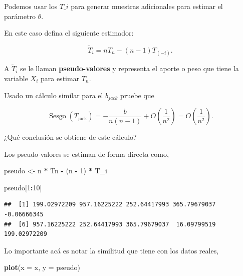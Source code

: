 \documentclass[
  12pt,
]{book}
\newenvironment{Shaded}{\begin{snugshade}}{\end{snugshade}}
\newcommand{\DataTypeTok}[1]{\textcolor[rgb]{0.13,0.29,0.53}{#1}}
\newcommand{\DecValTok}[1]{\textcolor[rgb]{0.00,0.00,0.81}{#1}}
\newcommand{\KeywordTok}[1]{\textcolor[rgb]{0.13,0.29,0.53}{\textbf{#1}}}
\newcommand{\NormalTok}[1]{#1}
\newcommand{\OperatorTok}[1]{\textcolor[rgb]{0.81,0.36,0.00}{\textbf{#1}}}
\newcommand{\StringTok}[1]{\textcolor[rgb]{0.31,0.60,0.02}{#1}}
\theoremstyle{definition}
\theoremstyle{definition}
\theoremstyle{definition}
\theoremstyle{remark}
\let\BeginKnitrBlock\begin \let\EndKnitrBlock\end
\begin{document}
Podemos usar los \(T\_i\) para generar muestras adicionales para
estimar el parámetro \(\theta\).

En este caso defina el siguiente estimador:

\[
\widetilde{T}_{i}=n T_{n}-(n-1) T_{(-i)}.
\]

\BeginKnitrBlock{remark}
{}A \(\widetilde{T}_{i}\) se le llaman \textbf{pseudo-valores} y
representa el aporte o peso que tiene la variable \(X_{i}\) para
estimar \(T_{n}\).
\EndKnitrBlock{remark}

\BeginKnitrBlock{exercise}
\protect\hypertarget{exr:unnamed-chunk-75}{}{\label{exr:unnamed-chunk-75} }Usado un cálculo similar para el \(b_{jack}\) pruebe que

\[
\operatorname{Sesgo}\left(T_{\text {jack}
}\right)=-\frac{b}{n(n-1)}+O\left(\frac{1}{n^{2}}\right)=O\left(\frac{1}{n^{2}}\right).
\]

¿Qué conclusión se obtiene de este cálculo?
\EndKnitrBlock{exercise}

\BeginKnitrBlock{exercise}
\protect\hypertarget{exr:unnamed-chunk-76}{}{\label{exr:unnamed-chunk-76} }Los pseudo-valores se estiman de forma directa como,
\EndKnitrBlock{exercise}

\begin{Shaded}
\begin{Highlighting}[]
\NormalTok{pseudo <-}\StringTok{ }\NormalTok{n }\OperatorTok{*}\StringTok{ }\NormalTok{Tn }\OperatorTok{-}\StringTok{ }\NormalTok{(n }\OperatorTok{-}\StringTok{ }\DecValTok{1}\NormalTok{) }\OperatorTok{*}\StringTok{ }\NormalTok{T_i}

\NormalTok{pseudo[}\DecValTok{1}\OperatorTok{:}\DecValTok{10}\NormalTok{]}
\end{Highlighting}
\end{Shaded}

\begin{verbatim}
##  [1] 199.02972209 957.16225222 252.64417993 365.79679037  -0.06666345
##  [6] 957.16225222 252.64417993 365.79679037  16.09799519 199.02972209
\end{verbatim}

Lo importante acá es notar la similitud que tiene con los datos
reales,

\begin{Shaded}
\begin{Highlighting}[]
\KeywordTok{plot}\NormalTok{(}\DataTypeTok{x =}\NormalTok{ x, }\DataTypeTok{y =}\NormalTok{ pseudo)}
\end{Highlighting}
\end{Shaded}
\end{document}
